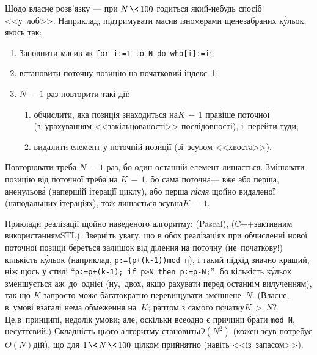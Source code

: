 Щодо власне розв'язку --- 
при ${N\,{\<}\,100}$ годиться який-небудь спосіб <<у~лоб>>. Наприклад, підтримувати масив із\nolinebreak[2] номерами ще\nolinebreak[3] не\nolinebreak[3] забраних к\'{у}льок, якось так:

\begin{enumerate}
\item
Заповнити масив як \texttt{for i:=1 to N do who[i]:=i};
\item
встановити поточну позицію на початковий індекс~1;
\item
${N\,{-}\,1}$ раз повторити такі дії:
\begin{enumerate}
\item
обчислити, яка позиція знаходиться на\nolinebreak[3] ${K\,{-}\,1}$ правіше поточної (з~урахуванням <<закільцованості>> послідовності), і~перейти туди;
\item
видалити елемент у поточній позиції (зі~зсувом <<хвоста>>).
\end{enumerate}
\end{enumerate}

Повторювати треба ${N\,{-}\,1}$ раз, бо один останній елемент лишається. Змінювати позицію від поточної треба на ${K\,{-}\,1}$, бо сама поточна\nolinebreak[3] --- вже або перша, а\nolinebreak[3] не\nolinebreak[3] нульов\'{а} (на\nolinebreak[2] першій ітерації циклу), або перша \emph{після} щойно видаленої (на\nolinebreak[3] подальших ітераціях), 
тож лишається зсув\nolinebreak[2] на\nolinebreak[3] ${K\,{-}\,1}$.

Приклади реалізації щойно наведеного алгоритму:  (Pascal),  (C++\nolinebreak[2] з\nolinebreak[3] активним використанням\nolinebreak[3] STL). Зверніть увагу, що в обох реалізаціях при обчисленні нової поточної позиції береться залишок від ділення на поточну (не~початкову!) кількість к\'{у}льок (наприклад, \verb"p:=(p+(k-1))"\nolinebreak[3] \verb"mod n"), і такий підхід значно кращий, ніж щось у стилі ``\texttt{\mbox{p:=p+(k-1);} if p>N then \mbox{p:=p-N};}'', бо кількість к\'{у}льок зменшується аж~до~однієї (ну,~двох, якщо рахувати перед останнім вилученням), так що $K$ запросто може багатократно перевищувати зменшене~$N$. (Власне, в~умові взагалі нема обмеження на~$K$; раптом з самого початку\nolinebreak[2] ${K\,{>}\,N}$? Це,\nolinebreak[2] в~принципі, недолік умови; але, оскільки все\nolinebreak[3] одно є причини бр\'{а}ти \texttt{mod~N}, несуттєвий.)
Складність цього алгоритму становить\nolinebreak[3] $O(N^2)$ (кожен зсув потребує $O(N)$\nolinebreak[3] дій), що для ${1\,{\<}\,N\,{\<}\,100}$ цілком прийнятно (навіть <<із~запасом>>).

